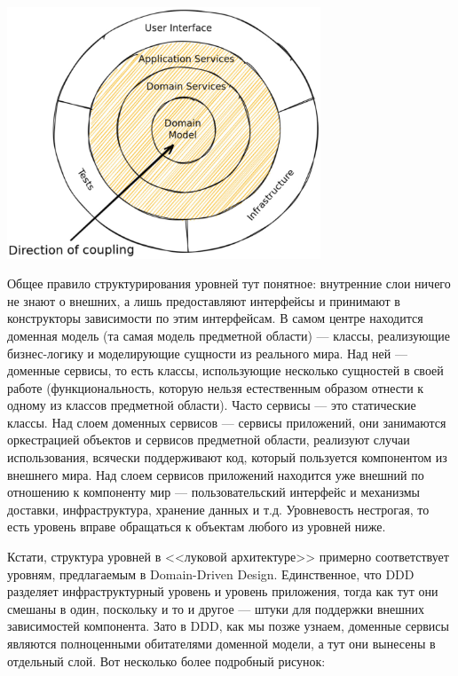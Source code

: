 \documentclass{../../text-style}
\begin{document}
\begin{center}
    \includegraphics[width=0.7\textwidth]{onionArchitecture.png}
\end{center}

Общее правило структурирования уровней тут понятное: внутренние слои ничего не знают о внешних, а лишь предоставляют интерфейсы и принимают в конструкторы зависимости по этим интерфейсам. В самом центре находится доменная модель (та самая модель предметной области) --- классы, реализующие бизнес-логику и моделирующие сущности из реального мира. Над ней --- доменные сервисы, то есть классы, использующие несколько сущностей в своей работе (функциональность, которую нельзя естественным образом отнести к одному из классов предметной области). Часто сервисы --- это статические классы. Над слоем доменных сервисов --- сервисы приложений, они занимаются оркестрацией объектов и сервисов предметной области, реализуют случаи использования, всячески поддерживают код, который пользуется компонентом из внешнего мира. Над слоем сервисов приложений находится уже внешний по отношению к компоненту мир --- пользовательский интерфейс и механизмы доставки, инфраструктура, хранение данных и т.д. Уровневость нестрогая, то есть уровень вправе обращаться к объектам любого из уровней ниже.

Кстати, структура уровней в <<луковой архитектуре>> примерно соответствует уровням, предлагаемым в Domain-Driven Design. Единственное, что DDD разделяет инфраструктурный уровень и уровень приложения, тогда как тут они смешаны в один, поскольку и то и другое --- штуки для поддержки внешних зависимостей компонента. Зато в DDD, как мы позже узнаем, доменные сервисы являются полноценными обитателями доменной модели, а тут они вынесены в отдельный слой. Вот несколько более подробный рисунок:
\end{document}
